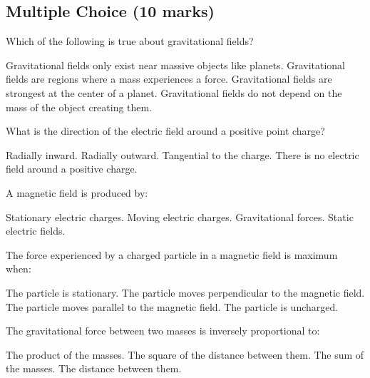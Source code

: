 \documentclass[addpoints]{exam}
\begin{document}
\newpage

\begin{questions}


\section*{Multiple Choice (10 marks)}
\vspace{5mm}

\question[1] Which of the following is true about gravitational fields?
\begin{choices}
    \choice Gravitational fields only exist near massive objects like planets.
    \correctchoice Gravitational fields are regions where a mass experiences a force.
    \choice Gravitational fields are strongest at the center of a planet.
    \choice Gravitational fields do not depend on the mass of the object creating them.
\end{choices}
\vspace{8mm}

\question[1] What is the direction of the electric field around a positive point charge?
\begin{choices}
    \choice Radially inward.
    \correctchoice Radially outward.
    \choice Tangential to the charge.
    \choice There is no electric field around a positive charge.
\end{choices}
\vspace{8mm}

\question[1] A magnetic field is produced by:
\begin{choices}
    \choice Stationary electric charges.
    \correctchoice Moving electric charges.
    \choice Gravitational forces.
    \choice Static electric fields.
\end{choices}
\vspace{8mm}

\question[1] The force experienced by a charged particle in a magnetic field is maximum when:
\begin{choices}
    \choice The particle is stationary.
    \correctchoice The particle moves perpendicular to the magnetic field.
    \choice The particle moves parallel to the magnetic field.
    \choice The particle is uncharged.
\end{choices}
\vspace{8mm}

\question[1] The gravitational force between two masses is inversely proportional to:
\begin{choices}
    \choice The product of the masses.
    \correctchoice The square of the distance between them.
    \choice The sum of the masses.
    \choice The distance between them.
\end{choices}
\vspace{8mm}


\end{questions}
\end{document}
